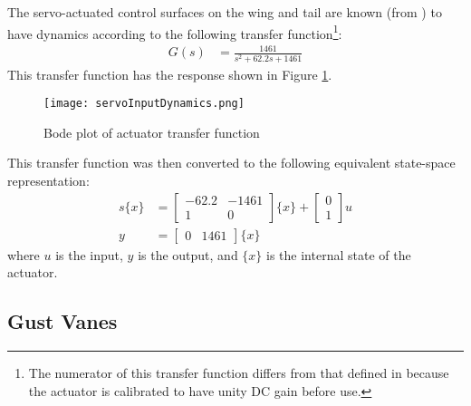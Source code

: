 The servo-actuated control surfaces on the wing and tail are known (from \cite{Quenzer2019}) to have dynamics according to the following transfer function\footnote{The numerator of this transfer function differs from that defined in \cite{Quenzer2019} because the actuator is calibrated to have unity DC gain before use.}:
\begin{align}
    G(s) &= \frac{1461}{s^2 + 62.2s + 1461}
\end{align}
This transfer function has the response shown in Figure \ref{fig:servoInputDynamics}.
\begin{figure}[H]
	\centering
	\label{fig:servoInputDynamics}
	\texttt{[image: servoInputDynamics.png]}
	\caption{Bode plot of actuator transfer function}
\end{figure}
This transfer function was then converted to the following equivalent state-space representation:
\begin{equation}
\begin{aligned}
    \label{eq:servoModel}
    s\{x\} &= \begin{bmatrix} -62.2 & -1461 \\ 1 & 0 \end{bmatrix} \{x\}
        + \begin{bmatrix} 0 \\ 1 \end{bmatrix} u \\
    y &= \begin{bmatrix} 0 & 1461 \end{bmatrix} \{x\}
\end{aligned}
\end{equation}
where $u$ is the input, $y$ is the output, and $\{x\}$ is the internal state of the actuator.

\subsection{Gust Vanes} %

